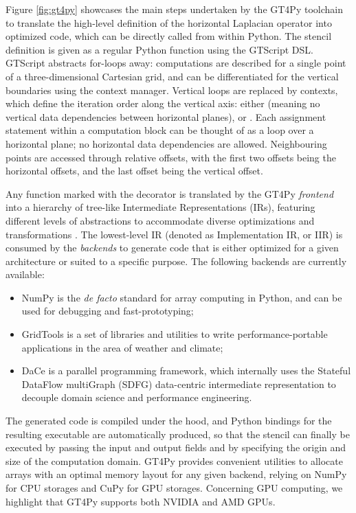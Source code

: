 \documentclass[main.tex]{subfiles}
\begin{document}
        Figure \ref{fig:gt4py} showcases the main steps undertaken by the GT4Py toolchain to translate the high-level definition of the horizontal Laplacian operator into optimized code, which can be directly called from within Python. The stencil definition is given as a regular Python function using the GTScript DSL. GTScript abstracts for-loops away: computations are described for a single point of a three-dimensional Cartesian grid, and can be differentiated for the vertical boundaries using the  context manager. Vertical loops are replaced by  contexts, which define the iteration order along the vertical axis: either  (meaning no vertical data dependencies between horizontal planes),  or . Each assignment statement within a computation block can be thought of as a loop over a horizontal plane; no horizontal data dependencies are allowed. Neighbouring points are accessed through relative offsets, with the first two offsets being the horizontal offsets, and the last offset being the vertical offset.

        Any function marked with the  decorator is translated by the GT4Py \emph{frontend} into a hierarchy of tree-like Intermediate Representations (IRs), featuring different levels of abstractions to accommodate diverse optimizations and transformations \citep{gysi21}. The lowest-level IR (denoted as Implementation IR, or IIR) is consumed by the \emph{backends} to generate code that is either optimized for a given architecture or suited to a specific purpose. The following backends are currently available:
        \begin{itemize}
            \item NumPy \citep{harris20} is the \emph{de facto} standard for array computing in Python, and can be used for debugging and fast-prototyping;
            \item GridTools \citep{afanasyev21} is a set of libraries and utilities to write performance-portable applications in the area of weather and climate;
            \item DaCe \citep{ben-nun19} is a parallel programming framework, which internally uses the Stateful DataFlow multiGraph (SDFG) data-centric intermediate representation to decouple domain science and performance engineering.
        \end{itemize}
        The generated code is compiled under the hood, and Python bindings for the resulting executable are automatically produced, so that the stencil can finally be executed by passing the input and output fields and by specifying the origin and size of the computation domain. GT4Py provides convenient utilities to allocate arrays with an optimal memory layout for any given backend, relying on NumPy for CPU storages and CuPy \citep{nishino17} for GPU storages. Concerning GPU computing, we highlight that GT4Py supports both NVIDIA and AMD GPUs.
\end{document}
